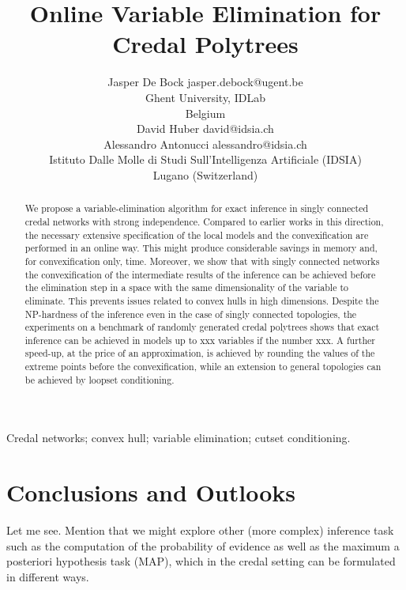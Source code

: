 \documentclass[twoside,11pt]{article}
\begin{document}
\title{Online Variable Elimination for Credal Polytrees}
\author{\name Jasper De Bock \email jasper.debock@ugent.be\\
\addr Ghent University, IDLab\\
Belgium\\
\AND
\name David Huber \email david@idsia.ch\\
\name Alessandro Antonucci \email alessandro@idsia.ch\\
\addr Istituto Dalle Molle di Studi Sull'Intelligenza Artificiale (IDSIA)\\
Lugano (Switzerland)}
\maketitle
\begin{abstract}%
We propose a variable-elimination algorithm for exact inference in singly connected credal networks with strong independence. Compared to earlier works in this direction, the necessary extensive specification of the local models and the convexification are performed in an online way. This might produce considerable savings in memory and, for convexification only, time. Moreover, we show that with singly connected networks the convexification of the intermediate results of the inference can be achieved before the elimination step in a space with the same dimensionality of the variable to eliminate. This prevents issues related to convex hulls in high dimensions. Despite the NP-hardness of the inference even in the case of singly connected topologies, the experiments on a benchmark of randomly generated credal polytrees shows that exact inference can be achieved in models up to xxx variables if the number xxx. A further speed-up, at the price of an approximation, is achieved by rounding the values of the extreme points before the convexification, while an extension to general topologies can be achieved by loopset conditioning.
\end{abstract}
\begin{keywords}
Credal networks; convex hull; variable elimination; cutset conditioning.
\end{keywords}





%
\section{Conclusions and Outlooks}
Let me see. Mention that we might explore other (more complex) inference task such as the computation of the probability of evidence as well as the maximum a posteriori hypothesis task (MAP), which in the credal setting can be formulated in different ways.

\end{document}
